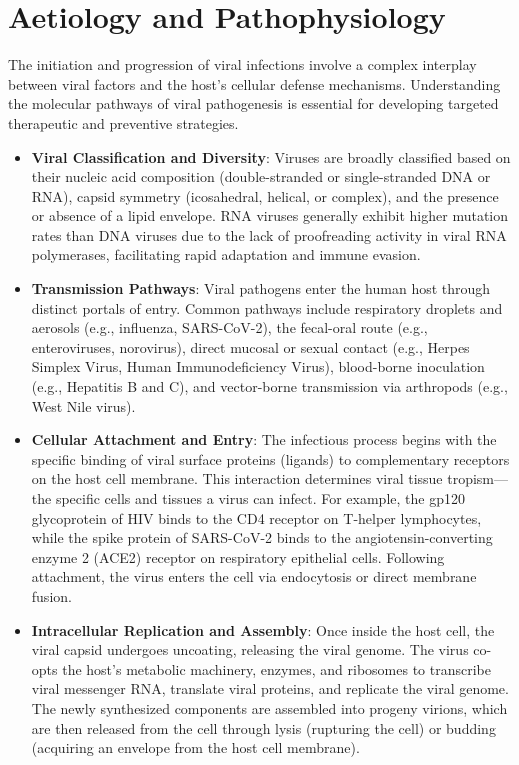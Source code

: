 \section*{Aetiology and Pathophysiology}
The initiation and progression of viral infections involve a complex interplay between viral factors and the host's cellular defense mechanisms. Understanding the molecular pathways of viral pathogenesis is essential for developing targeted therapeutic and preventive strategies.
\begin{itemize}
    \item \textbf{Viral Classification and Diversity}: Viruses are broadly classified based on their nucleic acid composition (double-stranded or single-stranded DNA or RNA), capsid symmetry (icosahedral, helical, or complex), and the presence or absence of a lipid envelope. RNA viruses generally exhibit higher mutation rates than DNA viruses due to the lack of proofreading activity in viral RNA polymerases, facilitating rapid adaptation and immune evasion.
    \item \textbf{Transmission Pathways}: Viral pathogens enter the human host through distinct portals of entry. Common pathways include respiratory droplets and aerosols (e.g., influenza, SARS-CoV-2), the fecal-oral route (e.g., enteroviruses, norovirus), direct mucosal or sexual contact (e.g., Herpes Simplex Virus, Human Immunodeficiency Virus), blood-borne inoculation (e.g., Hepatitis B and C), and vector-borne transmission via arthropods (e.g., West Nile virus).
    \item \textbf{Cellular Attachment and Entry}: The infectious process begins with the specific binding of viral surface proteins (ligands) to complementary receptors on the host cell membrane. This interaction determines viral tissue tropism—the specific cells and tissues a virus can infect. For example, the gp120 glycoprotein of HIV binds to the CD4 receptor on T-helper lymphocytes, while the spike protein of SARS-CoV-2 binds to the angiotensin-converting enzyme 2 (ACE2) receptor on respiratory epithelial cells. Following attachment, the virus enters the cell via endocytosis or direct membrane fusion.
    \item \textbf{Intracellular Replication and Assembly}: Once inside the host cell, the viral capsid undergoes uncoating, releasing the viral genome. The virus co-opts the host's metabolic machinery, enzymes, and ribosomes to transcribe viral messenger RNA, translate viral proteins, and replicate the viral genome. The newly synthesized components are assembled into progeny virions, which are then released from the cell through lysis (rupturing the cell) or budding (acquiring an envelope from the host cell membrane).

\end{itemize}
